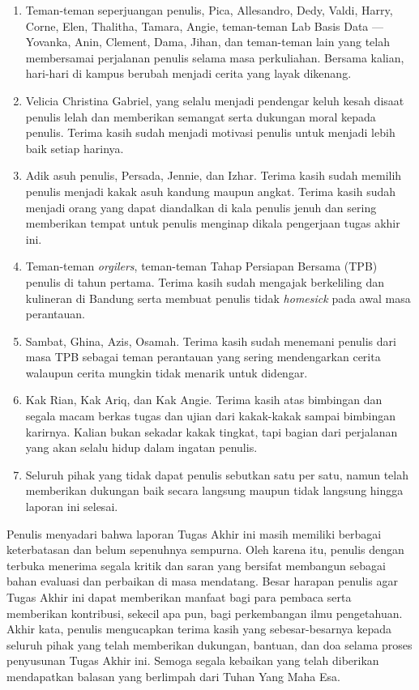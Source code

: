 \begin{enumerate}[1.]
    \item Teman-teman seperjuangan penulis, Pica, Allesandro, Dedy, Valdi, Harry, Corne, Elen, Thalitha, Tamara, Angie, teman-teman Lab Basis Data --- Yovanka, Anin, Clement, Dama, Jihan, dan teman-teman lain yang telah membersamai perjalanan penulis selama masa perkuliahan. Bersama kalian, hari-hari di kampus berubah menjadi cerita yang layak dikenang.

    \item Velicia Christina Gabriel, yang selalu menjadi pendengar keluh kesah disaat penulis lelah dan memberikan semangat serta dukungan moral kepada penulis. Terima kasih sudah menjadi motivasi penulis untuk menjadi lebih baik setiap harinya.

    \item Adik asuh penulis, Persada, Jennie, dan Izhar. Terima kasih sudah memilih penulis menjadi kakak asuh kandung maupun angkat. Terima kasih sudah menjadi orang yang dapat diandalkan di kala penulis jenuh dan sering memberikan tempat untuk penulis menginap dikala pengerjaan tugas akhir ini.

    \item Teman-teman \textit{orgilers}, teman-teman Tahap Persiapan Bersama (TPB) penulis di tahun pertama. Terima kasih sudah mengajak berkeliling dan kulineran di Bandung serta membuat penulis tidak \textit{homesick} pada awal masa perantauan.
    
    \item Sambat, Ghina, Azis, Osamah. Terima kasih sudah menemani penulis dari masa TPB sebagai teman perantauan yang sering mendengarkan cerita walaupun cerita mungkin tidak menarik untuk didengar.

    \item Kak Rian, Kak Ariq, dan Kak Angie. Terima kasih atas bimbingan dan segala macam berkas tugas dan ujian dari kakak-kakak sampai bimbingan karirnya. Kalian bukan sekadar kakak tingkat, tapi bagian dari perjalanan yang akan selalu hidup dalam ingatan penulis.

    \item Seluruh pihak yang tidak dapat penulis sebutkan satu per satu, namun telah memberikan dukungan baik secara langsung maupun tidak langsung hingga laporan ini selesai.
\end{enumerate}

Penulis menyadari bahwa laporan Tugas Akhir ini masih memiliki berbagai keterbatasan dan belum sepenuhnya sempurna. Oleh karena itu, penulis dengan terbuka menerima segala kritik dan saran yang bersifat membangun sebagai bahan evaluasi dan perbaikan di masa mendatang. Besar harapan penulis agar Tugas Akhir ini dapat memberikan manfaat bagi para pembaca serta memberikan kontribusi, sekecil apa pun, bagi perkembangan ilmu pengetahuan. Akhir kata, penulis mengucapkan terima kasih yang sebesar-besarnya kepada seluruh pihak yang telah memberikan dukungan, bantuan, dan doa selama proses penyusunan Tugas Akhir ini. Semoga segala kebaikan yang telah diberikan mendapatkan balasan yang berlimpah dari Tuhan Yang Maha Esa.

